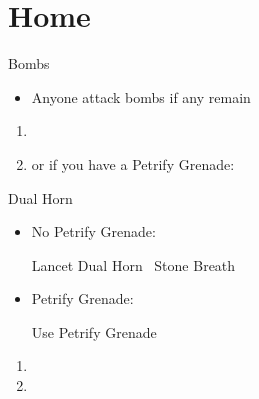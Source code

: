 \chapter{Home}
\begin{battle}{Bombs}
	\begin{itemize}
		\switch{\tidus}{\rikku}
		\rikkuf Use Silence Grenade (other throwable if no Silence Grenades)
		\rikkuf Use Smoke Bomb
		\auronf Attack Guado twice then defend for rest of fight
		\wakkaf Defend or heal \rikku\ if she gets hit
		\rikkuf Steal from each bomb once
		\rikkuf Throw 2x Grenade or 1x Throwable, if you have any extras
		\item Anyone attack bombs if any remain
	\end{itemize}
\end{battle}
\begin{enumerate}[resume]
	\item {}
	\item \formation{\tidus}{\rikku}{\auron} or if you have a Petrify Grenade: \formation{\tidus}{\wakka}{\auron}
\end{enumerate}
\begin{battle}{Dual Horn}
	\begin{itemize}
		\item No Petrify Grenade:
		\begin{itemize}
			\kimahrif Lancet Dual Horn
			\kimahrif \od\ Stone Breath
		\end{itemize}
		\item Petrify Grenade:
		\begin{itemize}
			\switch{anyone}{\rikku}
			\rikkuf Use Petrify Grenade
		\end{itemize}
	\end{itemize}
\end{battle}
\begin{enumerate}[resume]
	\item {}
	\item \formation{\tidus}{\rikku}{\auron}
\end{enumerate}
